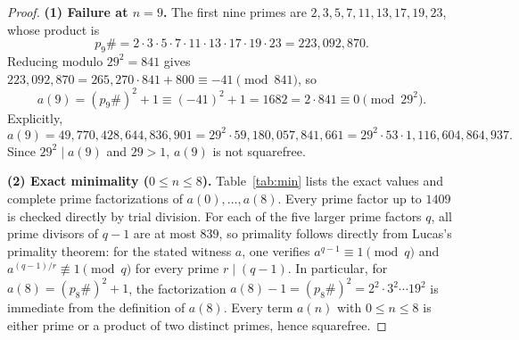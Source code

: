 \documentclass[11pt]{article}
\begin{document}
\begin{proof}
\textbf{(1) Failure at $n = 9$.} The first nine primes are $2, 3, 5, 7, 11, 13, 17, 19, 23$, whose product is
\[
p_9\# = 2 \cdot 3 \cdot 5 \cdot 7 \cdot 11 \cdot 13 \cdot 17 \cdot 19 \cdot 23 = 223{,}092{,}870.
\]
Reducing modulo $29^2 = 841$ gives $223{,}092{,}870 = 265{,}270 \cdot 841 + 800 \equiv -41 \pmod{841}$, so
\[
a(9) = (p_9\#)^2 + 1 \equiv (-41)^2 + 1 = 1682 = 2 \cdot 841 \equiv 0 \pmod{29^2}.
\]
Explicitly,
\[
a(9) = 49{,}770{,}428{,}644{,}836{,}901 = 29^2 \cdot 59{,}180{,}057{,}841{,}661 = 29^2 \cdot 53 \cdot 1{,}116{,}604{,}864{,}937.
\]
Since $29^2 \mid a(9)$ and $29 > 1$, $a(9)$ is not squarefree.

\medskip
\noindent\textbf{(2) Exact minimality ($0 \le n \le 8$).} Table~\ref{tab:min} lists the exact values and complete prime factorizations of $a(0), \dots, a(8)$. Every prime factor up to $1409$ is checked directly by trial division. For each of the five larger prime factors $q$, all prime divisors of $q - 1$ are at most $839$, so primality follows directly from Lucas's primality theorem: for the stated witness $a$, one verifies $a^{q-1} \equiv 1 \pmod q$ and $a^{(q-1)/r} \not\equiv 1 \pmod q$ for every prime $r \mid (q - 1)$. In particular, for $a(8) = (p_8\#)^2 + 1$, the factorization $a(8) - 1 = (p_8\#)^2 = 2^2 \cdot 3^2 \cdots 19^2$ is immediate from the definition of $a(8)$. Every term $a(n)$ with $0 \le n \le 8$ is either prime or a product of two distinct primes, hence squarefree.
\end{proof}
\end{document}
